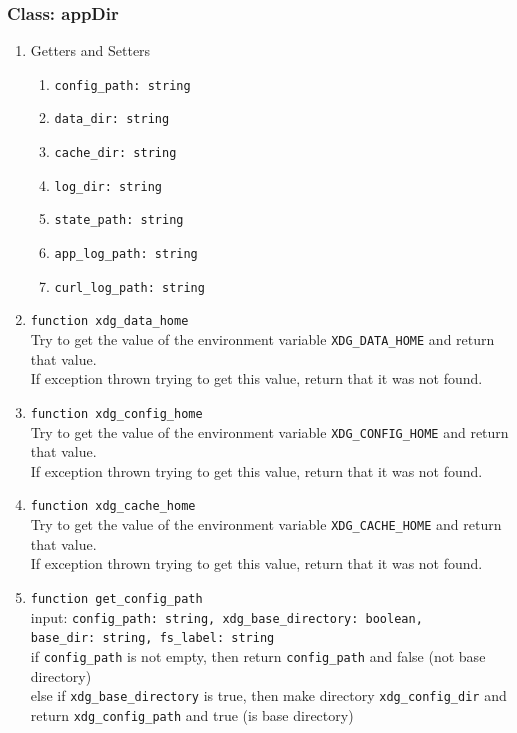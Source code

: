 \subsubsection{Class: appDir}
\begin{enumerate}
    \item Getters and Setters
    \begin{enumerate}
        \item \verb|config_path: string|
        \item \verb|data_dir: string|
        \item \verb|cache_dir: string|
        \item \verb|log_dir: string|
        \item \verb|state_path: string|
        \item \verb|app_log_path: string|
        \item \verb|curl_log_path: string|
    \end{enumerate}
    \item \verb|function xdg_data_home| \\
    Try to get the value of the environment variable \verb|XDG_DATA_HOME| and return that value. \\
    If exception thrown trying to get this value, return that it was not found.
    \item \verb|function xdg_config_home| \\
    Try to get the value of the environment variable \verb|XDG_CONFIG_HOME| and return that value. \\
    If exception thrown trying to get this value, return that it was not found.
    \item \verb|function xdg_cache_home| \\
    Try to get the value of the environment variable \verb|XDG_CACHE_HOME| and return that value. \\
    If exception thrown trying to get this value, return that it was not found.
    \item \verb|function get_config_path| \\
    input: \verb|config_path: string, xdg_base_directory: boolean,| \\ \verb|base_dir: string, fs_label: string| \\
    if \verb|config_path| is not empty, then return \verb|config_path| and false (not base directory) \\
    else if \verb|xdg_base_directory| is true, then make directory \verb|xdg_config_dir| and return \verb|xdg_config_path| and true (is base directory) \\

\end{enumerate}

